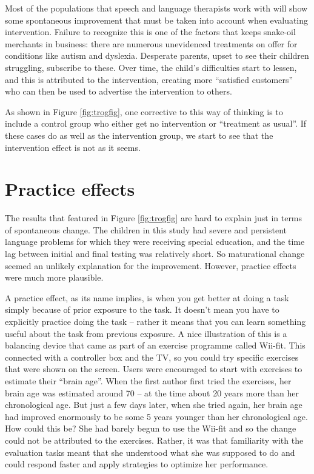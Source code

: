 \documentclass{krantz}
\begin{document}
Most of the populations that speech and language therapists work with will show some spontaneous improvement that must be taken into account when evaluating intervention. Failure to recognize this is one of the factors that keeps snake-oil merchants in business: there are numerous unevidenced treatments on offer for conditions like autism and dyslexia. Desperate parents, upset to see their children struggling, subscribe to these. Over time, the child's difficulties start to lessen, and this is attributed to the intervention, creating more ``satisfied customers'' who can then be used to advertise the intervention to others.

As shown in Figure \ref{fig:trogfig}, one corrective to this way of thinking is to include a control group who either get no intervention or ``treatment as usual''. If these cases do as well as the intervention group, we start to see that the intervention effect is not as it seems.

\hypertarget{practice-effects-1}{%
\section{Practice effects}\label{practice-effects-1}}

The results that featured in Figure \ref{fig:trogfig} are hard to explain just in terms of spontaneous change. The children in this study had severe and persistent language problems for which they were receiving special education, and the time lag between initial and final testing was relatively short. So maturational change seemed an unlikely explanation for the improvement. However, practice effects were much more plausible.

A practice effect, as its name implies, is when you get better at doing a task simply because of prior exposure to the task. It doesn't mean you have to explicitly practice doing the task -- rather it means that you can learn something useful about the task from previous exposure. A nice illustration of this is a balancing device that came as part of an exercise programme called Wii-fit. This connected with a controller box and the TV, so you could try specific exercises that were shown on the screen. Users were encouraged to start with exercises to estimate their ``brain age''. When the first author first tried the exercises, her brain age was estimated around 70 -- at the time about 20 years more than her chronological age. But just a few days later, when she tried again, her brain age had improved enormously to be some 5 years younger than her chronological age. How could this be? She had barely begun to use the Wii-fit and so the change could not be attributed to the exercises. Rather, it was that familiarity with the evaluation tasks meant that she understood what she was supposed to do and could respond faster and apply strategies to optimize her performance.
\end{document}
